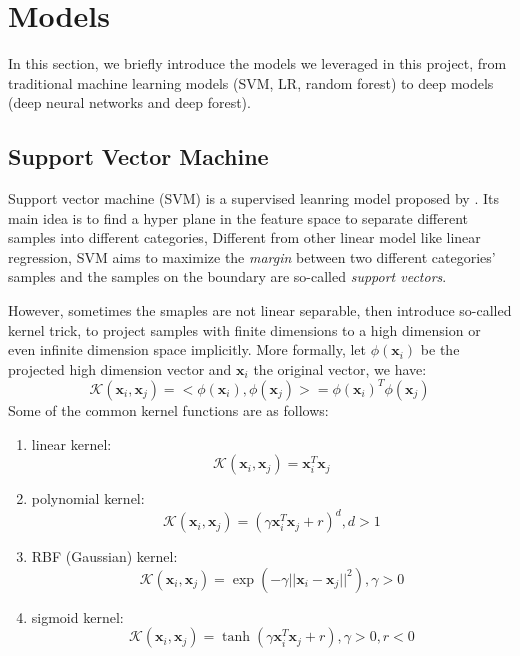 \documentclass[sigconf]{acmart}
\newcommand{\bx}{\mathbf{x}}
\begin{document}
	
	\section{Models}
	In this section, we briefly introduce the models we leveraged in this project, from traditional machine learning models (SVM, LR, random forest) to deep models (deep neural networks and deep forest).
	
	\subsection{Support Vector Machine}
	Support vector machine (SVM) is a supervised leanring model proposed by \citet{cortes1995support}. Its main idea is to find a hyper plane in the feature space to separate different samples into different categories, Different from other linear model like linear regression, SVM aims to maximize the \textit{margin} between two different categories' samples and the samples on the boundary are so-called \textit{support vectors}. 
	
	However, sometimes the smaples are not linear separable, then \citet{cristianini1999introduction} introduce so-called kernel trick, to project samples with finite dimensions to a high dimension or even infinite dimension space implicitly. More formally, let $\phi(\mathbf{x}_i)$ be the projected high dimension vector and $\mathbf{x}_i$ the original vector, we have:
	\begin{equation}
	\mathcal{K}(\mathbf{x}_i,\mathbf{x}_j)=<\phi(\mathbf{x}_i),\phi(\mathbf{x}_j)>=\phi(\mathbf{x}_i)^T\phi(\mathbf{x}_j)
	\end{equation}
	Some of the common kernel functions are as follows:
	\begin{enumerate}
		\item linear kernel:
		\begin{equation}
		\mathcal{K}(\mathbf{x}_i,\bx_j)=\bx_i^T\bx_j
		\end{equation}
		
		\item polynomial kernel:
		\begin{equation}
		\mathcal{K}(\bx_i,\bx_j)=(\gamma \bx_i^T\bx_j + r)^d, d>1
		\end{equation}
		
		\item RBF (Gaussian) kernel:
		\begin{equation}
		\mathcal{K}(\bx_i,\bx_j)=\exp(-\gamma ||\bx_i-\bx_j||^2),\gamma>0
		\end{equation}
		
		\item sigmoid kernel:  
		\begin{equation}
		\mathcal{K}(\bx_i,\bx_j)=\tanh(\gamma \bx_i^T\bx_j + r ), \gamma>0, r<0
		\end{equation}
	\end{enumerate}
	
\end{document}
